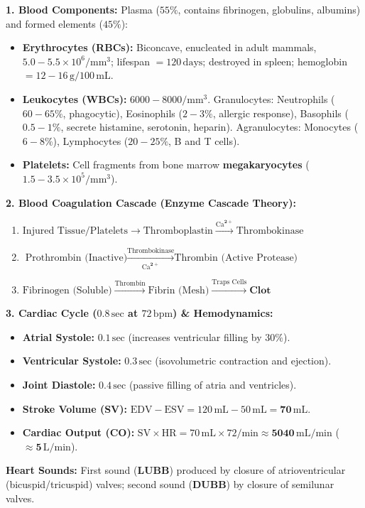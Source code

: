 \documentclass[10pt,twoside,openright]{book}
\begin{document}
\begin{conceptbox}
\textbf{1. Blood Components:}
Plasma ($55\%$, contains fibrinogen, globulins, albumins) and formed elements ($45\%$):
\begin{itemize}
  \item \textbf{Erythrocytes (RBCs):} Biconcave, enucleated in adult mammals, $5.0-5.5 \times 10^6/\mathrm{mm}^3$; lifespan $= 120\,\mathrm{days}$; destroyed in spleen; hemoglobin $= 12-16\,\mathrm{g}/100\,\mathrm{mL}$.
  \item \textbf{Leukocytes (WBCs):} $6000-8000/\mathrm{mm}^3$. Granulocytes: Neutrophils ($60-65\%$, phagocytic), Eosinophils ($2-3\%$, allergic response), Basophils ($0.5-1\%$, secrete histamine, serotonin, heparin). Agranulocytes: Monocytes ($6-8\%$), Lymphocytes ($20-25\%$, B and T cells).
  \item \textbf{Platelets:} Cell fragments from bone marrow \textbf{megakaryocytes} ($1.5-3.5 \times 10^5/\mathrm{mm}^3$).
\end{itemize}

\textbf{2. Blood Coagulation Cascade (Enzyme Cascade Theory):}
\begin{enumerate}[leftmargin=*]
  \item $\text{Injured Tissue/Platelets} \longrightarrow \text{Thromboplastin} \xrightarrow{\mathbf{\mathrm{Ca}^{2+}}} \text{Thrombokinase}$
  \item $\text{Prothrombin (Inactive)} \xrightarrow[\mathbf{\mathrm{Ca}^{2+}}]{\text{Thrombokinase}} \text{Thrombin (Active Protease)}$
  \item $\text{Fibrinogen (Soluble)} \xrightarrow{\text{Thrombin}} \text{Fibrin (Mesh)} \xrightarrow{\text{Traps Cells}} \textbf{Clot}$
\end{enumerate}

\textbf{3. Cardiac Cycle ($0.8\,\mathrm{sec}$ at $72\,\mathrm{bpm}$) \& Hemodynamics:}
\begin{itemize}[leftmargin=*]
  \item \textbf{Atrial Systole:} $0.1\,\mathrm{sec}$ (increases ventricular filling by $30\%$).
  \item \textbf{Ventricular Systole:} $0.3\,\mathrm{sec}$ (isovolumetric contraction and ejection).
  \item \textbf{Joint Diastole:} $0.4\,\mathrm{sec}$ (passive filling of atria and ventricles).
  \item \textbf{Stroke Volume (SV):} $\mathrm{EDV} - \mathrm{ESV} = 120\,\mathrm{mL} - 50\,\mathrm{mL} = \mathbf{70\,\mathrm{mL}}$.
  \item \textbf{Cardiac Output (CO):} $\text{SV} \times \text{HR} = 70\,\mathrm{mL} \times 72/\mathrm{min} \approx \mathbf{5040\,\mathrm{mL/min}}$ ($\approx \mathbf{5\,\mathrm{L/min}}$).
\end{itemize}
\textbf{Heart Sounds:} First sound (\textbf{LUBB}) produced by closure of atrioventricular (bicuspid/tricuspid) valves; second sound (\textbf{DUBB}) by closure of semilunar valves.


\end{conceptbox}
\end{document}
